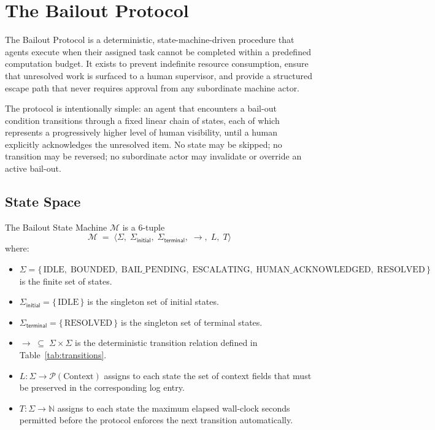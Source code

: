 \section{The Bailout Protocol}


The Bailout Protocol is a deterministic, state-machine-driven procedure that
agents execute when their assigned task cannot be completed within a
predefined computation budget.  It exists to prevent indefinite resource
consumption, ensure that unresolved work is surfaced to a human supervisor,
and provide a structured escape path that never requires approval from any
subordinate machine actor.

The protocol is intentionally simple: an agent that encounters a bail-out
condition transitions through a fixed linear chain of states, each of which
represents a progressively higher level of human visibility, until a human
explicitly acknowledges the unresolved item.  No state may be skipped; no
transition may be reversed; no subordinate actor may invalidate or override
an active bail-out.


\subsection{State Space}

The Bailout State Machine $\mathcal{M}$ is a 6-tuple
\[
\mathcal{M} \;=\; \bigl\langle \Sigma,\;\Sigma_{\mathsf{initial}},\;
\Sigma_{\mathsf{terminal}},\;\rightarrow,\;L,\;T \bigr\rangle
\]
where:

\begin{itemize}
  \item $\Sigma = \{\,\text{IDLE},\; \text{BOUNDED},\; \text{BAIL\_PENDING},\;
         \text{ESCALATING},\; \text{HUMAN\_ACKNOWLEDGED},\; \text{RESOLVED}\,\}$
         is the finite set of states.
  \item $\Sigma_{\mathsf{initial}} = \{\,\text{IDLE}\,\}$ is the singleton
         set of initial states.
  \item $\Sigma_{\mathsf{terminal}} = \{\,\text{RESOLVED}\,\}$ is the
         singleton set of terminal states.
  \item $\rightarrow \;\subseteq\; \Sigma \times \Sigma$ is the deterministic
         transition relation defined in Table~\ref{tab:transitions}.
  \item $L : \Sigma \to \mathcal{P}(\text{Context})$ assigns to each state the
         set of context fields that must be preserved in the corresponding log
         entry.
  \item $T : \Sigma \to \mathbb{N}$ assigns to each state the maximum elapsed
         wall-clock seconds permitted before the protocol enforces the
         next transition automatically.
\end{itemize}

